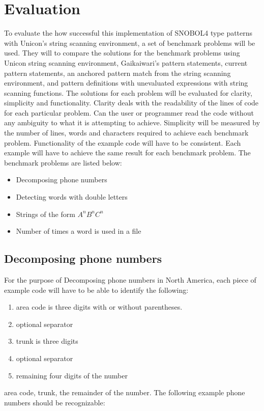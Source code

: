 \documentclass{article}
\begin{document}
\section{Evaluation}
To evaluate the how successful this implementation of SNOBOL4 type patterns with Unicon's string scanning environment, a set of benchmark problems will be used.  They will to compare the solutions for the benchmark problems using Unicon string scanning environment, Gaikaiwari's pattern statements, current pattern statements, an anchored pattern match from the string scanning environment, and pattern definitions with unevaluated expressions with string scanning functions.  The solutions for each problem will be evaluated for clarity, simplicity and functionality.  Clarity deals with the readability of the lines of code for each particular problem.  Can the user or programmer read the code without any ambiguity to what it is attempting to achieve.  Simplicity will be measured by the number of lines, words and characters required to achieve each benchmark problem.  Functionality of the example code will have to be consistent.  Each example will have to achieve the same result for each benchmark problem.  The benchmark problems are listed below:

\begin{itemize}
\item Decomposing phone numbers
\item Detecting words with double letters
\item Strings of the form \emph{$A^nB^nC^n$}
\item Number of times a word is used in a file
\end{itemize}

\subsection{Decomposing phone numbers}
For the purpose of Decomposing phone numbers in North America, each piece of example code will have to be able to identify the following:

\begin{enumerate}
\item area code is three digits with or without parentheses.
\item optional separator
\item trunk is three digits
\item optional separator
\item remaining four digits of the number
\end{enumerate}
area code, trunk, the remainder of the number.  The following example phone numbers should be recognizable:
\end{document}
